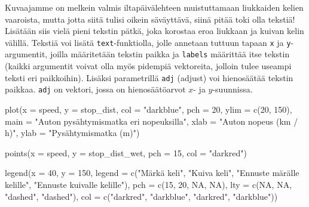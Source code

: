 \documentclass[
]{book}
\newenvironment{Shaded}{\begin{snugshade}}{\end{snugshade}}
\newcommand{\AttributeTok}[1]{\textcolor[rgb]{0.77,0.63,0.00}{#1}}
\newcommand{\ConstantTok}[1]{\textcolor[rgb]{0.00,0.00,0.00}{#1}}
\newcommand{\DecValTok}[1]{\textcolor[rgb]{0.00,0.00,0.81}{#1}}
\newcommand{\FunctionTok}[1]{\textcolor[rgb]{0.00,0.00,0.00}{#1}}
\newcommand{\NormalTok}[1]{#1}
\newcommand{\StringTok}[1]{\textcolor[rgb]{0.31,0.60,0.02}{#1}}
\begin{document}
Kuvaajamme on melkein valmis iltapäivälehteen muistuttamaan liukkaiden kelien vaaroista, mutta jotta siitä tulisi oikein säväyttävä, siinä pitää toki olla tekstiä! Lisätään siis vielä pieni tekstin pätkä, joka korostaa eroa liukkaan ja kuivan kelin välillä. Tekstiä voi lisätä \texttt{text}-funktiolla, jolle annetaan tuttuun tapaan \texttt{x} ja \texttt{y}-argumentit, joilla määritetään tekstin paikka ja \texttt{labels} määrittää itse tekstin (kaikki argumentit voivat olla myös pidempiä vektoreita, jolloin tulee useampi teksti eri paikkoihin). Lisäksi parametrillä \texttt{adj} (adjust) voi hienosäätää tekstin paikkaa. \texttt{adj} on vektori, jossa on hienosäätöarvot \(x\)- ja \(y\)-suunnissa.

\begin{Shaded}
\begin{Highlighting}[]
\FunctionTok{plot}\NormalTok{(}\AttributeTok{x =}\NormalTok{ speed, }\AttributeTok{y =}\NormalTok{ stop\_dist,}
     \AttributeTok{col =} \StringTok{"darkblue"}\NormalTok{, }\AttributeTok{pch =} \DecValTok{20}\NormalTok{,}
     \AttributeTok{ylim =} \FunctionTok{c}\NormalTok{(}\DecValTok{20}\NormalTok{, }\DecValTok{150}\NormalTok{),}
     \AttributeTok{main =} \StringTok{"Auton pysähtymismatka eri nopeuksilla"}\NormalTok{,}
     \AttributeTok{xlab =} \StringTok{"Auton nopeus (km / h)"}\NormalTok{, }\AttributeTok{ylab =} \StringTok{"Pysähtymismatka (m)"}\NormalTok{)}

\FunctionTok{points}\NormalTok{(}\AttributeTok{x =}\NormalTok{ speed, }\AttributeTok{y =}\NormalTok{ stop\_dist\_wet, }\AttributeTok{pch =} \DecValTok{15}\NormalTok{, }\AttributeTok{col =} \StringTok{"darkred"}\NormalTok{)}

\FunctionTok{legend}\NormalTok{(}\AttributeTok{x =} \DecValTok{40}\NormalTok{, }\AttributeTok{y =} \DecValTok{150}\NormalTok{,}
       \AttributeTok{legend =} \FunctionTok{c}\NormalTok{(}\StringTok{"Märkä keli"}\NormalTok{, }\StringTok{"Kuiva keli"}\NormalTok{,}
                  \StringTok{"Ennuste märälle kelille"}\NormalTok{,}
                  \StringTok{"Ennuste kuivalle kelille"}\NormalTok{),}
       \AttributeTok{pch =} \FunctionTok{c}\NormalTok{(}\DecValTok{15}\NormalTok{, }\DecValTok{20}\NormalTok{, }\ConstantTok{NA}\NormalTok{, }\ConstantTok{NA}\NormalTok{),}
       \AttributeTok{lty =} \FunctionTok{c}\NormalTok{(}\ConstantTok{NA}\NormalTok{, }\ConstantTok{NA}\NormalTok{, }\StringTok{"dashed"}\NormalTok{, }\StringTok{"dashed"}\NormalTok{),}
       \AttributeTok{col =} \FunctionTok{c}\NormalTok{(}\StringTok{"darkred"}\NormalTok{, }\StringTok{"darkblue"}\NormalTok{, }\StringTok{"darkred"}\NormalTok{, }\StringTok{"darkblue"}\NormalTok{))}


\end{Highlighting}
\end{Shaded}
\end{document}
